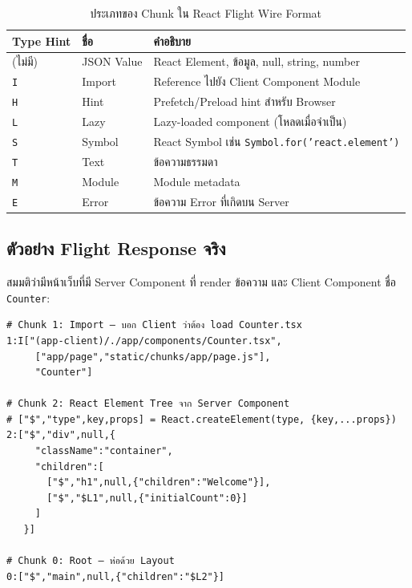 \documentclass[12pt,oneside]{report}
\begin{document}
\begin{table}[ht]
    \centering
    \caption{ประเภทของ Chunk ใน React Flight Wire Format}
    \vspace{0.3cm}
    \begin{tabular}{lll}
        \toprule
        \textbf{Type Hint} & \textbf{ชื่อ} & \textbf{คำอธิบาย} \\
        \midrule
        (ไม่มี) & JSON Value & React Element, ข้อมูล, null, string, number \\
        \texttt{I} & Import & Reference ไปยัง Client Component Module \\
        \texttt{H} & Hint & Prefetch/Preload hint สำหรับ Browser \\
        \texttt{L} & Lazy & Lazy-loaded component (โหลดเมื่อจำเป็น) \\
        \texttt{S} & Symbol & React Symbol เช่น \texttt{Symbol.for('react.element')} \\
        \texttt{T} & Text & ข้อความธรรมดา \\
        \texttt{M} & Module & Module metadata \\
        \texttt{E} & Error & ข้อความ Error ที่เกิดบน Server \\
        \bottomrule
    \end{tabular}
    \label{tab:chunk_types}
\end{table}

\newpage

\subsection{ตัวอย่าง Flight Response จริง}

สมมติว่ามีหน้าเว็บที่มี Server Component ที่ render ข้อความ และ Client Component ชื่อ \texttt{Counter}:

\begin{lstlisting}[language=flight, caption=ตัวอย่าง Flight Wire Format Response จาก Next.js]
# Chunk 1: Import — บอก Client ว่าต้อง load Counter.tsx
1:I["(app-client)/./app/components/Counter.tsx",
     ["app/page","static/chunks/app/page.js"],
     "Counter"]

# Chunk 2: React Element Tree จาก Server Component
# ["$","type",key,props] = React.createElement(type, {key,...props})
2:["$","div",null,{
     "className":"container",
     "children":[
       ["$","h1",null,{"children":"Welcome"}],
       ["$","$L1",null,{"initialCount":0}]
     ]
   }]

# Chunk 0: Root — ห่อด้วย Layout
0:["$","main",null,{"children":"$L2"}]
\end{lstlisting}
\end{document}
